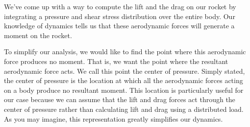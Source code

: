 \documentclass[10pt, openany, titlepage]{book}
\theoremstyle{definition}
\begin{document}
We've come up with a way to compute the lift and the drag on our rocket by integrating a pressure and shear stress distribution over the entire body. Our knowledge of dynamics tells us that these aerodynamic forces will generate a moment on the rocket.

To simplify our analysis, we would like to find the point where this aerodynamic force produces no moment. That is, we want the point where the resultant aerodynamic force acts. We call this point the center of pressure. Simply stated, the center of pressure is the location at which all the aerodynamic forces acting on a body produce no resultant moment. This location is particularly useful for our case because we can assume that the lift and drag forces act through the center of pressure rather than calculating lift and drag using a distributed load. As you may imagine, this representation greatly simplifies our dynamics.
\end{document}
